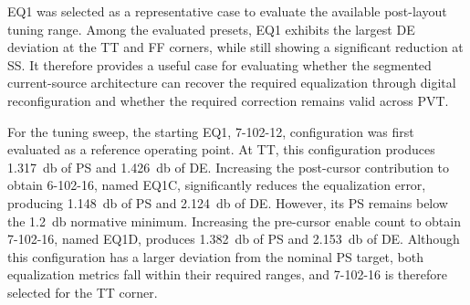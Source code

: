 
EQ1 was selected as a representative case to evaluate the available post-layout tuning range. Among the evaluated presets, EQ1 exhibits the largest \ac{DE} deviation at the \ac{TT} and \ac{FF} corners, while still showing a significant reduction at \ac{SS}. It therefore provides a useful case for evaluating whether the segmented current-source architecture can recover the required equalization through digital reconfiguration and whether the required correction remains valid across \ac{PVT}.

For the tuning sweep, the starting EQ1, 7-102-12, configuration was first evaluated as a reference operating point. At \ac{TT}, this configuration produces \SI{1.317}{\decibel} of \ac{PS} and \SI{1.426}{\decibel} of \ac{DE}. Increasing the post-cursor contribution to obtain 6-102-16, named EQ1C, significantly reduces the equalization error, producing \SI{1.148}{\decibel} of \ac{PS} and \SI{2.124}{\decibel} of \ac{DE}. However, its \ac{PS} remains below the \SI{1.2}{\decibel} normative minimum. Increasing the pre-cursor enable count to obtain 7-102-16, named EQ1D, produces \SI{1.382}{\decibel} of \ac{PS} and \SI{2.153}{\decibel} of \ac{DE}. Although this configuration has a larger deviation from the nominal \ac{PS} target, both equalization metrics fall within their required ranges, and 7-102-16 is therefore selected for the \ac{TT} corner.

